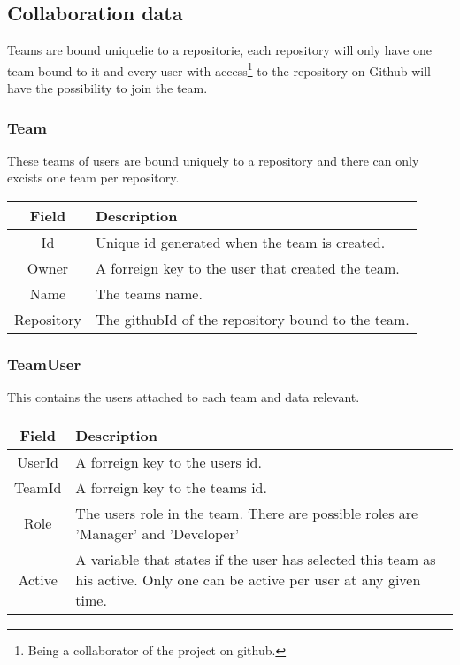\subsection{Collaboration data}
Teams are bound uniquelie to a repositorie, each repository will only have one team bound to it and every user with access\footnote{Being a collaborator of the project on github.} to the repository on Github will have the possibility to join the team.  


\subsubsection*{Team}
These teams of users are bound uniquely to a repository and there can only excists one team per repository. \\

\vspace{0.5cm}
\begin{tabularx}{\linewidth}{| c | X |}
    \hline
    \rowcolor[gray]{0.8}
    \textbf{Field} & \textbf{Description} \\
    \hline
    Id & Unique id generated when the team is created.\\ \hline
   	Owner & A forreign key to the user that created the team.\\ \hline
   	Name & The teams name.\\ \hline
    Repository & The githubId of the repository bound to the team.\\ 
    \hline
\end{tabularx}
\vspace{0.5cm}

\subsubsection*{TeamUser}
This contains the users attached to each team and data relevant. \\

\vspace{0.5cm}
\begin{tabularx}{\linewidth}{| c | X |}
    \hline
    \rowcolor[gray]{0.8}
    \textbf{Field} & \textbf{Description} \\
    \hline
    UserId & A forreign key to the users id.\\ \hline
   	TeamId & A forreign key to the teams id.\\ \hline
   	Role & The users role in the team. There are possible roles are 'Manager' and 'Developer'\\ \hline
    Active & A variable that states if the user has selected this team as his active. Only one can be active per user at any given time.\\ 
    \hline
\end{tabularx}
\vspace{0.5cm}

